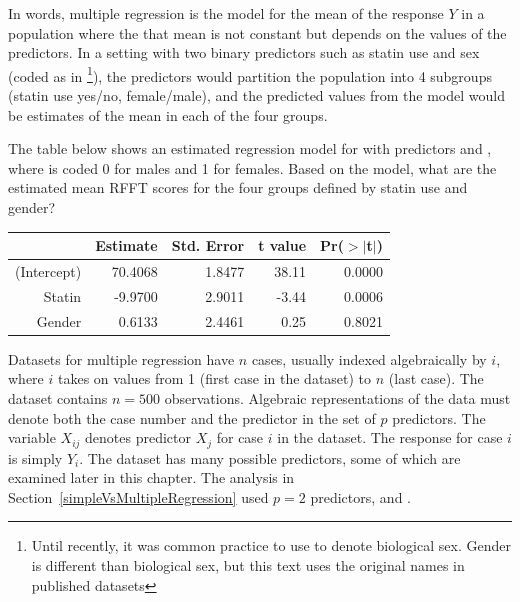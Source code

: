 In words, multiple regression is the model for the mean of the response $Y$ in a population where the that mean is not constant but depends on the values of the predictors.  In a setting with two binary predictors such as statin use and sex (coded as  in \footnote{Until recently, it was common practice to use  to denote biological sex. Gender is different than biological sex, but this text uses the original names in published datasets}), the predictors would partition the population into 4 subgroups (statin use yes/no, female/male), and the predicted values from the model would be estimates of the mean in each of the four groups.

\begin{exercise}
The table below shows an estimated regression model for  with predictors  and , where  is coded 0 for males and 1 for females.  Based on the model, what are the estimated mean RFFT scores for the four groups defined by statin use and gender? 
\begin{table}[ht]
\centering
\begin{tabular}{rrrrr}
  \hline
 & Estimate & Std. Error & t value & Pr($>$$|$t$|$) \\ 
  \hline
(Intercept) & 70.4068 & 1.8477 & 38.11 & 0.0000 \\ 
  Statin & -9.9700 & 2.9011 & -3.44 & 0.0006 \\ 
  Gender & 0.6133 & 2.4461 & 0.25 & 0.8021 \\ 
   \hline
\end{tabular}
\end{table}
\end{exercise}

Datasets for multiple regression have $n$ cases, usually indexed algebraically by $i$, where $i$ takes on values from 1 (first case in the dataset) to $n$ (last case).  The dataset  contains $n = 500$ observations.  Algebraic representations of the data must denote both the case number and the predictor in the set of $p$ predictors. The variable $X_{ij}$ denotes predictor $X_j$ for case $i$ in the dataset.  The response for case $i$ is simply $Y_i$. The dataset  has many possible predictors, some of which are examined later in this chapter.  The analysis in Section~\ref{simpleVsMultipleRegression} used $p=2$ predictors,  and .

